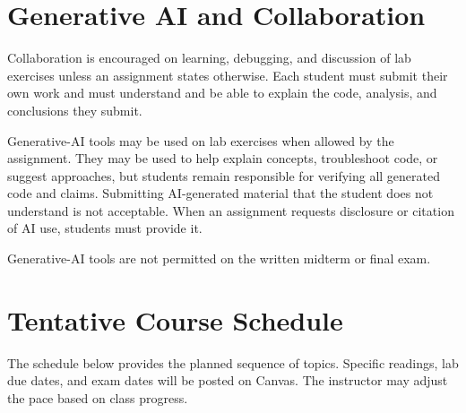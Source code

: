 \documentclass[11pt]{article}
\begin{document}
\section{Generative AI and Collaboration}

Collaboration is encouraged on learning, debugging, and discussion of lab exercises unless an assignment states otherwise. Each student must submit their own work and must understand and be able to explain the code, analysis, and conclusions they submit.

Generative-AI tools may be used on lab exercises when allowed by the assignment. They may be used to help explain concepts, troubleshoot code, or suggest approaches, but students remain responsible for verifying all generated code and claims. Submitting AI-generated material that the student does not understand is not acceptable. When an assignment requests disclosure or citation of AI use, students must provide it.

Generative-AI tools are not permitted on the written midterm or final exam.

\section{Tentative Course Schedule}

The schedule below provides the planned sequence of topics. Specific readings, lab due dates, and exam dates will be posted on Canvas. The instructor may adjust the pace based on class progress.
\end{document}
